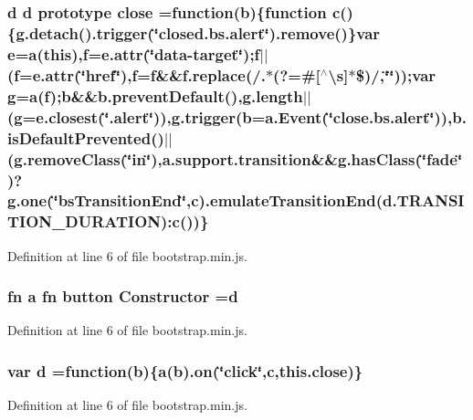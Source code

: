 \subsubsection[{close}]{ {\bf d} {\bf d} {\bf prototype} close =function({\bf b})\{function {\bf c}()\{g.\+detach().trigger(\char`\"{}closed.\+bs.\+alert\char`\"{}).remove()\}var {\bf e}={\bf a}({\bf this}),{\bf f}={\bf e.\+attr}(\char`\"{}data-\/target\char`\"{});f$\vert$$\vert$({\bf f}={\bf e.\+attr}(\char`\"{}href\char`\"{}),f={\bf f}\&\&f.\+replace(/.$\ast$(?=\#[$^\wedge$\textbackslash{}s]$\ast$\$)/,\char`\"{}\char`\"{}));var g={\bf a}({\bf f});{\bf b}\&\&b.\+prevent\+Default(),g.\+length$\vert$$\vert$(g=e.\+closest(\char`\"{}.alert\char`\"{})),g.\+trigger({\bf b}=a.\+Event(\char`\"{}close.\+bs.\+alert\char`\"{})),b.\+is\+Default\+Prevented()$\vert$$\vert$(g.\+remove\+Class(\char`\"{}in\char`\"{}),a.\+support.\+transition\&\&{\bf g.\+has\+Class}(\char`\"{}fade\char`\"{})?g.\+one(\char`\"{}bs\+Transition\+End\char`\"{},c).{\bf emulate\+Transition\+End}({\bf d.\+T\+R\+A\+N\+S\+I\+T\+I\+O\+N\+\_\+\+D\+U\+R\+A\+T\+I\+O\+N})\+:{\bf c}())\}}\label{bootstrap_8min_8js_a72fbb3628c3cc943ced8aad64247888c}


Definition at line 6 of file bootstrap.\+min.\+js.

\subsubsection[{Constructor}]{ {\bf fn} {\bf a} {\bf fn} {\bf button} Constructor ={\bf d}}\label{bootstrap_8min_8js_a0545907c609a48549a0cf5d4c692f851}


Definition at line 6 of file bootstrap.\+min.\+js.

\subsubsection[{d}]{\setlength{\rightskip}{0pt plus 5cm}var d =function({\bf b})\{{\bf a}({\bf b}).{\bf on}(\char`\"{}click\char`\"{},c,{\bf this.\+close})\}}\label{bootstrap_8min_8js_aeb337d295abaddb5ec3cb34cc2e2bbc9}


Definition at line 6 of file bootstrap.\+min.\+js.

